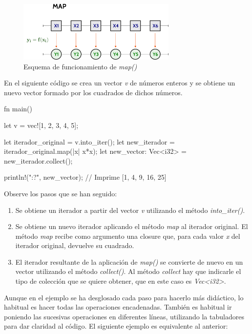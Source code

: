 \begin{figure}[htb]
   \begin{center}
      \includegraphics[width=0.7\textwidth]{img/map.png}
      \caption{Esquema de funcionamiento de \textit{map()}}
      \label{fig_map}
   \end{center}
\end{figure}
      
En el siguiente código se crea un vector \textit{v} de números enteros y se obtiene un nuevo vector formado por los cuadrados de dichos números.

\vspace{0.7em}
\begin{Codigo}
fn main() {
   let v = vec![1, 2, 3, 4, 5];
   
   let iterador_original = v.into_iter();
   let new_iterador = iterador_original.map(|x| x*x);
   let new_vector: Vec<i32> = new_iterador.collect();
   
   println!("{:?}", new_vector); // Imprime [1, 4, 9, 16, 25]
}
\end{Codigo}

Observe los pasos que se han seguido:
\begin{enumerate}
   \item Se obtiene un iterador a partir del vector \textit{v} utilizando el método \textit{into\_iter()}.
   \item Se obtiene un nuevo iterador aplicando el método \textit{map} al iterador original. El método \textit{map} recibe como argumento una closure que, para cada valor \textit{x} del iterador original, devuelve su cuadrado.
   \item El iterador resultante de la aplicación de \textit{map()} se convierte de nuevo en un vector utilizando el método \textit{collect()}. Al método \textit{collect} hay que indicarle el tipo de colección que se quiere obtener, que en este caso es \textit{Vec<i32>}.
\end{enumerate}

Aunque en el ejemplo se ha desglosado cada paso para hacerlo más didáctico, lo habitual es hacer todas las operaciones encadenadas. También es habitual ir poniendo las sucesivas operaciones en diferentes líneas, utilizando la tabuladores para dar claridad al código. El siguiente ejemplo es equivalente al anterior:

